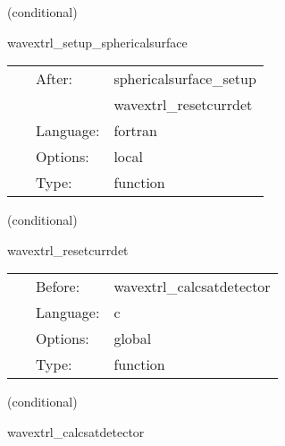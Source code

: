\documentclass{article}
\begin{document}
\vspace{5mm}

   (conditional) 

\hspace{5mm} wavextrl\_setup\_sphericalsurface 

\hspace{5mm}{\it setup detectors from spherical surface } 


\hspace{5mm}

 \begin{tabular*}{160mm}{cll} 
~ & After:  & sphericalsurface\_setup \\ 
~& ~ &wavextrl\_resetcurrdet\\ 
~ & Language:  & fortran \\ 
~ & Options:  & local \\ 
~ & Type:  & function \\ 
\end{tabular*} 


\vspace{5mm}

   (conditional) 

\hspace{5mm} wavextrl\_resetcurrdet 

\hspace{5mm}{\it reset the value of the current\_detector, needed for the while loop next } 


\hspace{5mm}

 \begin{tabular*}{160mm}{cll} 
~ & Before:  & wavextrl\_calcsatdetector \\ 
~ & Language:  & c \\ 
~ & Options:  & global \\ 
~ & Type:  & function \\ 
\end{tabular*} 


\vspace{5mm}

   (conditional) 

\hspace{5mm} wavextrl\_calcsatdetector 

\hspace{5mm}{\it calculations done for each detector, we loop over the detectors } 


\hspace{5mm}
\end{document}
